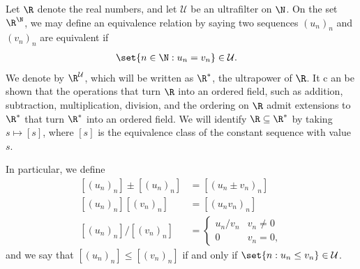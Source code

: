 \documentclass[10pt]{mypackage}
\begin{document}
Let $\R$ denote the real numbers, and let $ \mathcal{U} $ be an ultrafilter on $\N$. On the set $\R^{\N}$, we may define an equivalence relation by saying two sequences $\left( u_n \right)_n$ and $\left( v_n \right)_n$ are equivalent if
\begin{align*}
  \set{n\in \N : u_n = v_n}&\in \mathcal{U}.
\end{align*}
We denote by $\R^{\mathcal{U}}$, which will be written as $\R^{\ast}$, the ultrapower of $\R$. It c an be shown that the operations that turn $\R$ into an ordered field, such as addition, subtraction, multiplication, division, and the ordering on $\R$ admit extensions to $\R^{\ast}$ that turn $\R^{\ast}$ into an ordered field. We will identify $\R\subseteq \R^{\ast}$ by taking $s\mapsto \left[ s \right]$, where $\left[ s \right]$ is the equivalence class of the constant sequence with value $s$.

In particular, we define
\begin{align*}
  \left[ \left( u_n \right)_n \right]\pm \left[ \left( u_n \right)_n \right] &= \left[ \left( u_n \pm v_n \right)_n \right]\\
  \left[ \left( u_n \right)_n \right] \left[ \left( v_n \right)_n \right] &= \left[ \left( u_nv_n \right)_n \right]\\
  \left[ \left( u_n \right)_n \right]/\left[ \left( v_n \right)_n \right] &= \begin{cases}
    u_n/v_n & v_n\neq 0\\
    0 & v_n = 0,
  \end{cases}
\end{align*}
and we say that $\left[ \left( u_n \right)_n \right]\leq \left[ \left( v_n \right)_n \right]$ if and only if $\set{n : u_n\leq v_n}\in \mathcal{U}$.
\end{document}
